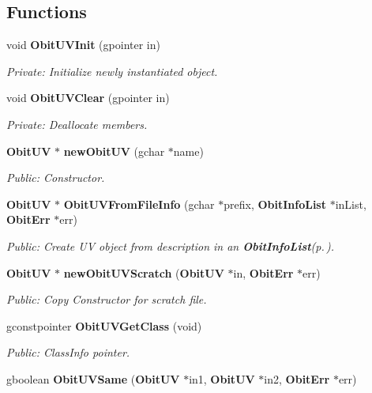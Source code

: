 \subsection*{Functions}
\begin{CompactItemize}
\item 
void {\bf Obit\-UVInit} (gpointer in)
\begin{CompactList}\small\item\em Private: Initialize newly instantiated object. \item\end{CompactList}\item 
void {\bf Obit\-UVClear} (gpointer in)
\begin{CompactList}\small\item\em Private: Deallocate members. \item\end{CompactList}\item 
{\bf Obit\-UV} $\ast$ {\bf new\-Obit\-UV} (gchar $\ast$name)
\begin{CompactList}\small\item\em Public: Constructor. \item\end{CompactList}\item 
{\bf Obit\-UV} $\ast$ {\bf Obit\-UVFrom\-File\-Info} (gchar $\ast$prefix, {\bf Obit\-Info\-List} $\ast$in\-List, {\bf Obit\-Err} $\ast$err)
\begin{CompactList}\small\item\em Public: Create UV object from description in an {\bf Obit\-Info\-List}{\rm (p.\,\pageref{structObitInfoList})}. \item\end{CompactList}\item 
{\bf Obit\-UV} $\ast$ {\bf new\-Obit\-UVScratch} ({\bf Obit\-UV} $\ast$in, {\bf Obit\-Err} $\ast$err)
\begin{CompactList}\small\item\em Public: Copy Constructor for scratch file. \item\end{CompactList}\item 
gconstpointer {\bf Obit\-UVGet\-Class} (void)
\begin{CompactList}\small\item\em Public: Class\-Info pointer. \item\end{CompactList}\item 
gboolean {\bf Obit\-UVSame} ({\bf Obit\-UV} $\ast$in1, {\bf Obit\-UV} $\ast$in2, {\bf Obit\-Err} $\ast$err)

\end{CompactItemize}
